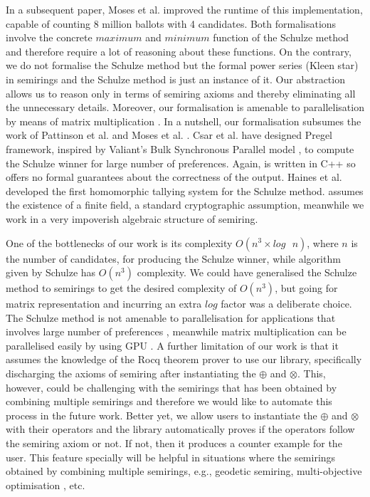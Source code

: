 \documentclass[a4paper,UKenglish,cleveref, autoref, thm-restate, anonymous]{lipics-v2021}
\begin{document}
In a subsequent paper, Moses et al. \cite{10.1007/978-3-319-68687-5_5} improved the runtime of this implementation, capable of counting 8 million ballots with 4 candidates.
Both formalisations involve the concrete $maximum$ and $minimum$ function of the Schulze method and 
therefore  require a lot of reasoning about these functions. On the contrary, we do not formalise the 
Schulze method but the formal power series (Kleen star) in semirings and the Schulze method is just an instance of it. 
Our abstraction allows us to reason only in terms of semiring axioms and thereby eliminating all the unnecessary details.
Moreover, our formalisation is amenable to parallelisation by means of matrix multiplication \cite{chang2022revisiting}.
In a nutshell,  our formalisation subsumes the work of Pattinson et al. \cite{pattinson2017schulze} and Moses et al. \cite{10.1007/978-3-319-68687-5_5}. Csar et al.  \cite{10.5555/3304415.3304442} have designed Pregel framework, inspired by Valiant’s Bulk Synchronous Parallel model \cite{10.1145/79173.79181}, to compute the Schulze winner for large number of preferences. 
Again, \cite{10.5555/3304415.3304442} is written in C++ so offers no formal 
guarantees about the correctness of the output. Haines et al. \cite{haines2019verifiable} developed the first homomorphic tallying system for the Schulze method. \cite{haines2019verifiable} assumes the existence of a finite field, a standard cryptographic assumption, meanwhile we work in a very impoverish algebraic structure of semiring. 



\vspace{2mm}
One of the bottlenecks of our work is its complexity $O(n^3 \times log\text{ }n)$, where 
$n$ is the number of candidates, for producing the Schulze winner, while algorithm 
given by Schulze \cite{schulze2011new} has $O(n^3)$ complexity. We could have 
generalised the Schulze method to 
semirings to get the desired complexity of $O(n^3)$, but going 
for matrix representation and incurring an extra $log$ factor was 
a deliberate choice. The Schulze method is not amenable to 
parallelisation for applications that involves large number of 
preferences \cite{10.5555/3304415.3304442}, meanwhile 
matrix multiplication can be parallelised easily by using 
GPU \cite{chang2022revisiting}.
A further limitation of our work is that it assumes the knowledge 
of the Rocq theorem prover to use our library,  specifically discharging the 
axioms of semiring after instantiating the $\oplus$ and $\otimes$. 
This, however, could be challenging with the semirings that has been 
obtained by combining multiple semirings 
and therefore we would like to automate this process in the future work.
Better yet, we allow users to instantiate the $\oplus$ and $\otimes$ 
with their operators and the library automatically proves if 
the operators follow the semiring axiom or not. If not, then it produces 
a counter example for the user. This feature specially will be helpful in 
situations where  the semirings 
obtained by combining multiple semirings, e.g., geodetic semiring, 
multi-objective optimisation \cite{manger2020algebraic}, etc.  
\end{document}
